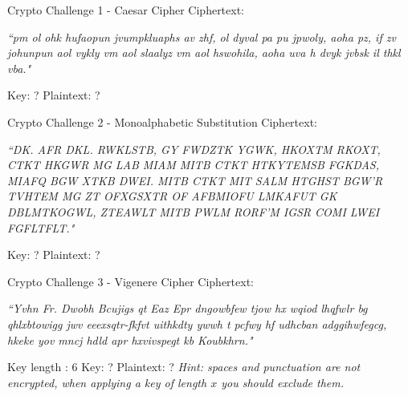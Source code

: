 \documentclass{beamer}
\begin{document}
\begin{frame}{Crypto Challenge 1 - Caesar Cipher}
Ciphertext: {\small \textit{``pm ol ohk hufaopun jvumpkluaphs av zhf, ol dyval pa pu jpwoly, aoha pz, if zv johunpun aol vykly vm aol slaalyz vm aol hswohila, aoha uva h dvyk jvbsk il thkl vba."} \par} 
Key: ? \newline
Plaintext: ? 
\end{frame}

\begin{frame}{Crypto Challenge 2 - Monoalphabetic Substitution}
Ciphertext: {\small \textit{``DK. AFR DKL. RWKLSTB, GY FWDZTK YGWK, HKOXTM RKOXT, CTKT HKGWR MG LAB MIAM MITB CTKT HTKYTEMSB FGKDAS, MIAFQ BGW XTKB DWEI. MITB CTKT MIT SALM HTGHST BGW'R TVHTEM MG ZT OFXGSXTR OF AFBMIOFU LMKAFUT GK DBLMTKOGWL, ZTEAWLT MITB PWLM RORF'M IGSR COMI LWEI FGFLTFLT."} \par} 
Key: ? \newline
Plaintext: ? 
\end{frame}

\begin{frame}{Crypto Challenge 3 - Vigenere Cipher }
Ciphertext: {\small \textit{``Yvhn Fr. Dwobh Bcujigs qt Eaz Epr dngowbfew tjow hx wqiod lhqfwlr bg qhlxbtowigg jwv eeexsqtr-fkfvt uithkdty ywwh t pcfwy hf udhcban adggihwfegcg, hkeke yov mncj hdld apr hxvivspegt kb Koubkhrn."} \par}
Key length : 6\newline
Key: ? \newline
Plaintext: ? \newline
\textit{Hint: spaces and punctuation are not encrypted, when applying a key of length \(x\) you should exclude them.} 
\end{frame}

\backcover
\end{document}
